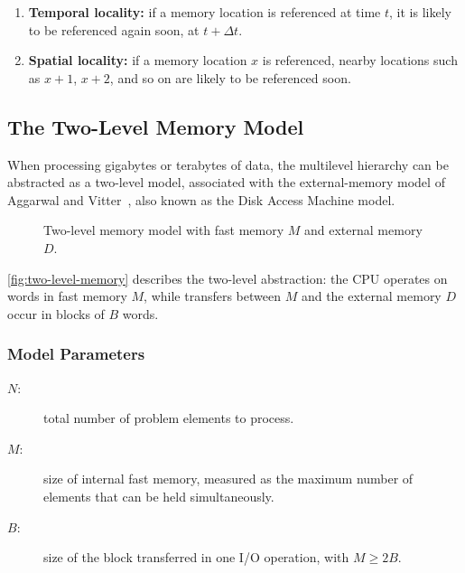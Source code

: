 \begin{enumerate}
  \item \textbf{Temporal locality:} if a memory location is referenced at time
    $t$, it is likely to be referenced again soon, at $t + \Delta t$.
  \item \textbf{Spatial locality:} if a memory location $x$ is referenced,
    nearby locations such as $x+1$, $x+2$, and so on are likely to be
    referenced soon.
\end{enumerate}

\subsection{The Two-Level Memory Model}

When processing gigabytes or terabytes of data, the multilevel hierarchy can
be abstracted as a two-level model, associated with the external-memory model
of Aggarwal and Vitter~\cite{aggarwal1988}, also known as the Disk Access
Machine model.

\begin{figure}[H]
  \centering
  \caption{Two-level memory model with fast memory $M$ and external memory $D$.}
  \label{fig:two-level-memory}
\end{figure}

\autoref{fig:two-level-memory} describes the two-level abstraction: the
CPU operates on words in fast memory $M$, while transfers between $M$ and the
external memory $D$ occur in blocks of $B$ words.

\subsubsection{Model Parameters}

\begin{description}
  \item[$N$:] total number of problem elements to process.
  \item[$M$:] size of internal fast memory, measured as the maximum number of
    elements that can be held simultaneously.
  \item[$B$:] size of the block transferred in one I/O operation, with
    $M \geq 2B$.
\end{description}

